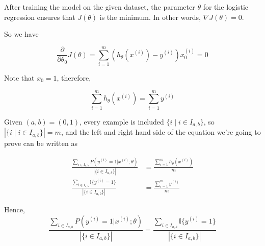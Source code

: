 \begin{answer}
	After training the model on the given dataset, the parameter $\theta$ for the logistic regression ensures that $J(\theta)$ is the minimum. In other words, $\nabla J(\theta)=0$.
	
	So we have
	
	$$
	\frac{\partial}{\partial \theta_0} J(\theta)=\sum_{i = 1}^{m} (h_{\theta}(x^{(i)}) - y^{(i)})x^{(i)}_0=0
	$$
	
	Note that $x_0=1$, therefore,
	
	$$
	\sum_{i = 1}^{m} h_{\theta}(x^{(i)}) = \sum_{i = 1}^{m} y^{(i)}
	$$
	
	Given $(a,b)=(0, 1)$, every example is included $\{i\mid i\in I_{a,b}\}$, so $|\{i\mid i\in I_{a,b}\}|=m$, and the left and right hand side of the equation we're going to prove can be written as
	
	$$
	\begin{aligned}
		\frac{\sum_{i\in I_{a,b}}  P\left(y^{(i)}=1|x^{(i)};\theta\right)}
		{{|\{i\in I_{a,b}\}|}} &= \frac{\sum_{i = 1}^{m} h_{\theta}(x^{(i)})}{m}\\
		\frac{\sum_{i\in I_{a,b}} \mathbb{I}\{y^{(i)} = 1\}}{|\{i\in I_{a,b}\}|} &= \frac{\sum_{i = 1}^{m} y^{(i)}}{m}
	\end{aligned}
	$$
	
	Hence, 
	$$
	\frac{\sum_{i\in I_{a,b}}  P\left(y^{(i)}=1|x^{(i)};\theta\right)}
	{{|\{i\in I_{a,b}\}|}}
	= \frac{\sum_{i\in I_{a,b}} \mathbb{I}\{y^{(i)} = 1\}}
	{|\{i\in I_{a,b}\}|}
	$$
\end{answer}
